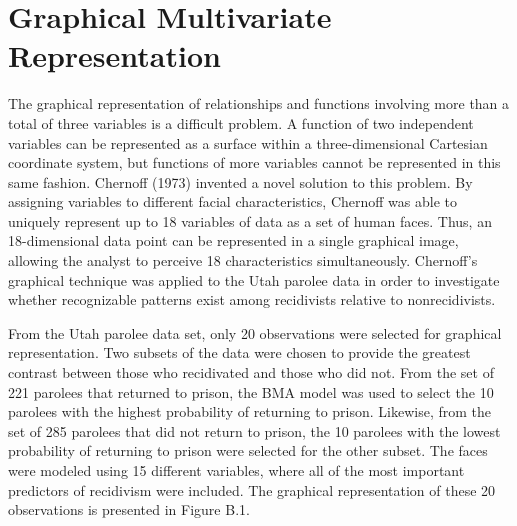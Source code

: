 \chapter{Graphical Multivariate Representation}\label{appendix2}
\fixchapterheading

\vspace{0.8cm}

The graphical representation of relationships and functions involving more than a total of three variables is a difficult problem.  A function of two independent variables can be represented as a surface within a three-dimensional Cartesian coordinate system, but functions of more variables cannot be represented in this same fashion.  Chernoff (1973) invented a novel solution to this problem.  By assigning variables to different facial characteristics, Chernoff was able to uniquely represent up to 18 variables of data as a set of human faces.  Thus, an 18-dimensional data point can be represented in a single graphical image, allowing the analyst to perceive 18 characteristics simultaneously.  Chernoff's graphical technique was applied to the Utah parolee data in order to investigate whether recognizable patterns exist among recidivists relative to nonrecidivists.

From the Utah parolee data set, only 20 observations were selected for graphical representation.  Two subsets of the data were chosen to provide the greatest contrast between those who recidivated and those who did not.  From the set of 221 parolees that returned to prison, the BMA model was used to select the 10 parolees with the highest probability of returning to prison. Likewise, from the set of 285 parolees that did not return to prison, the 10 parolees with the lowest probability of returning to prison were selected for the other subset.  The faces were modeled using 15 different variables, where all of the most important predictors of recidivism were included.  The graphical representation of these 20 observations is presented in Figure B.1.

